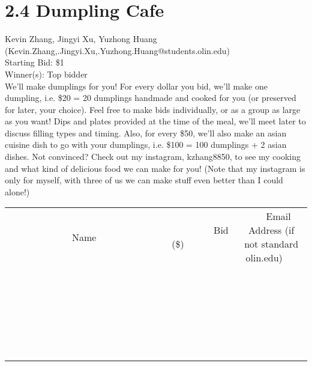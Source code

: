 \documentclass[11pt]{article}
\begin{document}
\section*{2.4 Dumpling Cafe}
Kevin Zhang, Jingyi Xu, Yuzhong Huang (Kevin.Zhang,.Jingyi.Xu,.Yuzhong.Huang@students.olin.edu) \\
Starting Bid: \$1 \\
Winner(s): 
Top bidder \\
We'll make dumplings for you! For every dollar you bid, we'll make one dumpling, i.e. \$20 = 20 dumplings handmade and cooked for you (or preserved for later, your choice). Feel free to make bids individually, or as a group as large as you want! Dips and plates provided at the time of the meal, we'll meet later to discuss filling types and timing. Also, for every \$50, we'll also make an asian cuisine dish to go with your dumplings, i.e. \$100 = 100 dumplings + 2 asian dishes. Not convinced? Check out my instagram, kzhang8850, to see my cooking and what kind of delicious food we can make for you! (Note that my instagram is only for myself, with three of us we can make stuff even better than I could alone!) \\[6ex]
\begin{tabular}{c c c}
~~~~~~~~~~~~~Name~~~~~~~~~~~~~ & ~~~~~~~~~Bid (\$)~~~~~~~~~ & ~~~Email Address (if not standard olin.edu)~~~ \\
 & & \\
\hline
 & & \\
\hline
 & & \\
\hline
 & & \\
\hline
 & & \\
\hline
 & & \\
\hline
 & & \\
\hline
 & & \\
\hline
 & & \\
\hline
 & & \\
\hline
 & & \\
\hline
 & & \\
\hline
 & & \\
\hline
 & & \\
\hline
 & & \\
\hline
 & & \\
\hline
 & & \\
\hline
 & & \\
\hline
 & & \\
\hline
 & & \\
\hline
 & & \\
\hline
 & & \\
\hline
 & & \\
\hline
 & & \\
\hline
 & & \\
\hline
 & & \\
\hline
\end{tabular}
\clearpage
\end{document}
